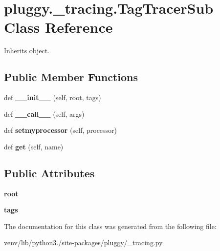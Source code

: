 \hypertarget{classpluggy_1_1__tracing_1_1_tag_tracer_sub}{}\section{pluggy.\+\_\+tracing.\+Tag\+Tracer\+Sub Class Reference}
\label{classpluggy_1_1__tracing_1_1_tag_tracer_sub}


Inherits object.

\subsection*{Public Member Functions}
\begin{DoxyCompactItemize}
\item 
\mbox{\label{classpluggy_1_1__tracing_1_1_tag_tracer_sub_a0d2d3d42c3c576b0cbf476d0115afcee}} 
def {\bfseries \+\_\+\+\_\+init\+\_\+\+\_\+} (self, root, tags)
\item 
\mbox{\label{classpluggy_1_1__tracing_1_1_tag_tracer_sub_a4b66bcde1ce82ec330a2b945022d6644}} 
def {\bfseries \+\_\+\+\_\+call\+\_\+\+\_\+} (self, args)
\item 
\mbox{\label{classpluggy_1_1__tracing_1_1_tag_tracer_sub_a981d33bfa71cb16cfe5457de4178909c}} 
def {\bfseries setmyprocessor} (self, processor)
\item 
\mbox{\label{classpluggy_1_1__tracing_1_1_tag_tracer_sub_afdf1a8f8632b412f49a66e6b96b64b7e}} 
def {\bfseries get} (self, name)
\end{DoxyCompactItemize}
\subsection*{Public Attributes}
\begin{DoxyCompactItemize}
\item 
\mbox{\label{classpluggy_1_1__tracing_1_1_tag_tracer_sub_a6c4507526f107f7164e835afab60a3e3}} 
{\bfseries root}
\item 
\mbox{\label{classpluggy_1_1__tracing_1_1_tag_tracer_sub_ab6cdcdb184a643454e1f489c2dc4d941}} 
{\bfseries tags}
\end{DoxyCompactItemize}


The documentation for this class was generated from the following file\+:\begin{DoxyCompactItemize}
\item 
venv/lib/python3./site-\/packages/pluggy/\+\_\+tracing.\+py\end{DoxyCompactItemize}
